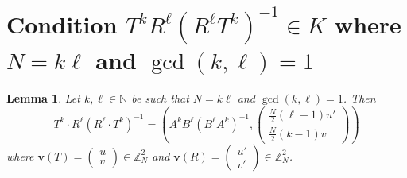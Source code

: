 \documentclass[10pt]{amsart}
\theoremstyle{plain}
\newtheorem{lemma}[theorem]{Lemma}
\theoremstyle{definition}
\theoremstyle{remark}%
\newcommand{\N}{\mathbb{N}}
\newcommand{\Z}{\mathbb{Z}}
\newcommand{\f}{\mathbf{v}}
\newcommand{\mat}[4]{\left(\begin{array}{cc}
 #1 & #2\\
 #3 & #4\\
\end{array}\right)}
\begin{document}
\section{Condition $T^{k}R^{\ell}(R^{\ell}T^{k})^{-1}\in K$ where  $N=k\ell$ and $\gcd(k,\ell)=1$}\label{section_9}





\begin{lemma}\label{N}
Let $k, \ell\in\N$ be such that $N=k\ell$ and $\gcd(k,\ell)=1$.  Then
$$T^k\cdot R^\ell\left(R^\ell\cdot T^k\right)^{-1}=\left(A^kB^\ell(B^\ell A^k)^{-1},\left(\begin{array}{c}\frac{N}{2}(\ell-1)u'\\[2mm]\frac{N}{2}(k-1)v\end{array}\right)\right)$$
where $\f(T)=\left(\begin{smallmatrix}u\\v\end{smallmatrix}\right)\in\Z_N^2$ and $\f(R)=\left(\begin{smallmatrix}u'\\v'\end{smallmatrix}\right)\in\Z_N^2$.
\end{lemma}
\end{document}
